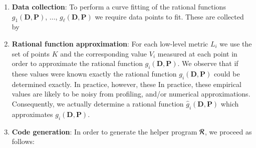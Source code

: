 \begin{enumerate}
\item \textbf{Data collection}: 
To perform a curve fitting of the rational functions 
$g_1(\bm{D}, \bm{P})$, $\ldots$, $g_{\ell}(\bm{D}, \bm{P})$
we require data points to fit. These are collected by 
\item \textbf{Rational function approximation}: 
For each low-level metric $L_i$ we use the set of points $K$ 
and the corresponding value $V_i$ measured at each point
in order to approximate
the rational function $g_i(\bm{D},\bm{P})$.
\iflongversion
We observe that if these values
were known exactly the rational function
$g_i(\bm{D}, \bm{P})$ could be determined exactly.
In practice, however, these
\else
In practice, these
\fi
empirical values are likely to be noisy from profiling,
and/or numerical approximations.
Consequently, we actually determine a rational function
$\hat{g}_i(\bm{D}, \bm{P})$ which approximates
$g_i(\bm{D}, \bm{P})$.
\item \textbf{Code generation}: 
In order to generate the helper program ${\cal R}$, we 
proceed as follows:
\end{enumerate}
